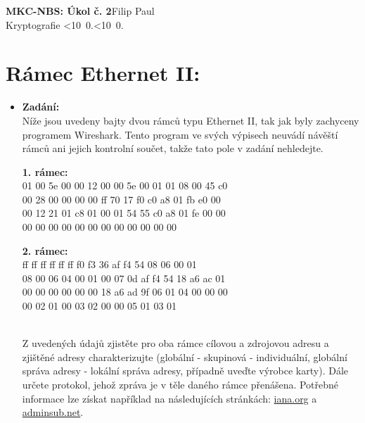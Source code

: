 \documentclass[10pt, a4paper]{article}%
\def\mydate{\leavevmode\hbox{\twodigits\day.\twodigits\month.\the\year}}
\def\twodigits#1{\ifnum#1<10 0\fi\the#1}
\begin{document}
\begin{flushleft}%
	\textbf{\Large{MKC-NBS: Úkol č. 2}}\hfill Filip Paul\\
	\large{Kryptografie \hfill\mydate}
\end{flushleft}
\section*{\large{\textbf{Rámec Ethernet II:}}}
	\begin{itemize}[label={}]
		\item \textbf{Zadání:}\\
		Níže jsou uvedeny bajty dvou rámců typu Ethernet II, tak jak byly zachyceny programem 
		Wireshark. Tento program ve svých výpisech neuvádí návěští rámců ani jejich kontrolní součet, 
		takže tato pole v zadání nehledejte.\\

		\begin{minipage}{0.49\textwidth}
			\textbf{1. rámec:}\\
			01 00 5e 00 00 12 00 00 5e 00 01 01 08 00 45 c0\\
			00 28 00 00 00 00 ff 70 17 f0 c0 a8 01 fb e0 00\\
			00 12 21 01 c8 01 00 01 54 55 c0 a8 01 fe 00 00\\
			00 00 00 00 00 00 00 00 00 00 00 00
		\end{minipage}
		\begin{minipage}{0.49\textwidth}
			\textbf{2. rámec:}\\
			ff ff ff ff ff ff f0 f3 36 af f4 54 08 06 00 01\\ 
			08 00 06 04 00 01 00 07 0d af f4 54 18 a6 ac 01\\ 
			00 00 00 00 00 00 18 a6 ad 9f 06 01 04 00 00 00\\ 
			00 02 01 00 03 02 00 00 05 01 03 01
		\end{minipage}\\

		Z uvedených údajů zjistěte pro oba rámce cílovou a zdrojovou adresu a zjištěné adresy 
		charakterizujte (globální - skupinová - individuální, globální správa adresy - lokální správa adresy, 
		případně uveďte výrobce karty). Dále určete protokol, jehož zpráva je v těle daného rámce 
		přenášena. Potřebné informace lze získat například na následujících stránkách: 
		\href{https://www.iana.org/assignments/ethernet-numbers/ethernet-numbers.xhtml}{\color{blue} iana.org}
		a \href{https://www.adminsub.net/mac-address-finder}{\color{blue} adminsub.net}.


\end{itemize}
\end{document}
